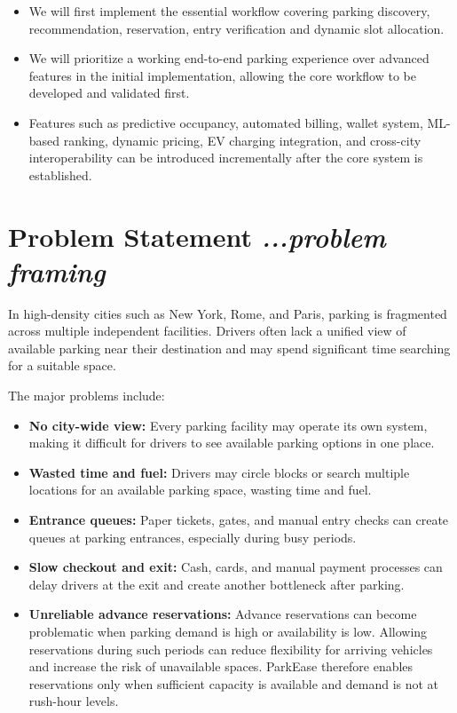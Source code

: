 \documentclass[12pt,a4paper]{article}
\begin{document}
\begin{itemize}
    \item We will first implement the essential workflow covering parking discovery, recommendation, reservation, entry verification and dynamic slot allocation.

    \item We will prioritize a working end-to-end parking experience over advanced features in the initial implementation, allowing the core workflow to be developed and validated first.

    \item Features such as predictive occupancy, automated billing, wallet system, ML-based ranking, dynamic pricing, EV charging integration, and cross-city interoperability can be introduced incrementally after the core system is established.
\end{itemize}


\section{\textbf{Problem Statement}
\hfill
{\small\mdseries\itshape ...problem framing}}

In high-density cities such as New York, Rome, and Paris, parking is fragmented across multiple independent facilities. Drivers often lack a unified view of available parking near their destination and may spend significant time searching for a suitable space.

The major problems include:

\begin{itemize}
    \item \textbf{No city-wide view:} Every parking facility may operate its own system, making it difficult for drivers to see available parking options in one place.

    \item \textbf{Wasted time and fuel:} Drivers may circle blocks or search multiple locations for an available parking space, wasting time and fuel.

    \item \textbf{Entrance queues:} Paper tickets, gates, and manual entry checks can create queues at parking entrances, especially during busy periods.

    \item \textbf{Slow checkout and exit:} Cash, cards, and manual payment processes can delay drivers at the exit and create another bottleneck after parking.

    \item \textbf{Unreliable advance reservations:} Advance reservations can become problematic when parking demand is high or availability is low. Allowing reservations during such periods can reduce flexibility for arriving vehicles and increase the risk of unavailable spaces. ParkEase therefore enables reservations only when sufficient capacity is available and demand is not at rush-hour levels.
\end{itemize}
\end{document}
